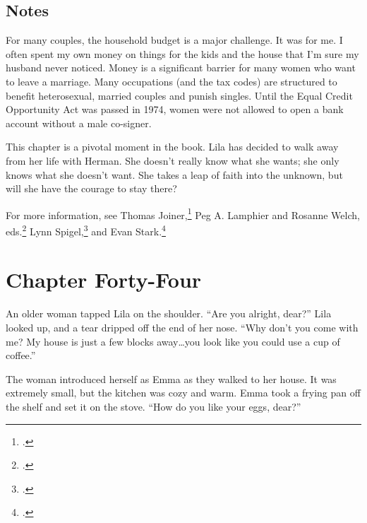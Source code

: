 \documentclass[
  american,
  letterpaper,
]{book}
\begin{document}
\section{Notes}\label{notes-45}

For many couples, the household budget is a major challenge. It was for
me. I often spent my own money on things for the kids and the house that
I'm sure my husband never noticed. Money is a significant barrier for
many women who want to leave a marriage. Many occupations (and the tax
codes) are structured to benefit heterosexual, married couples and
punish singles. Until the Equal Credit Opportunity Act was passed in
1974, women were not allowed to open a bank account without a male
co-signer.

This chapter is a pivotal moment in the book. Lila has decided to walk
away from her life with Herman. She doesn't really know what she wants;
she only knows what she doesn't want. She takes a leap of faith into the
unknown, but will she have the courage to stay there?

For more information, see Thomas Joiner,\footnote{.}
Peg A. Lamphier and Rosanne Welch, eds.\footnote{.} Lynn
Spigel,\footnote{.} and Evan Stark.\footnote{.}


\chapter{Chapter Forty-Four}\label{chapter-forty-four}

An older woman tapped Lila on the shoulder. ``Are you alright, dear?''
Lila looked up, and a tear dripped off the end of her nose. ``Why don't
you come with me? My house is just a few blocks away\ldots you look like
you could use a cup of coffee.''

The woman introduced herself as Emma as they walked to her house. It was
extremely small, but the kitchen was cozy and warm. Emma took a frying
pan off the shelf and set it on the stove. ``How do you like your eggs,
dear?''
\end{document}
